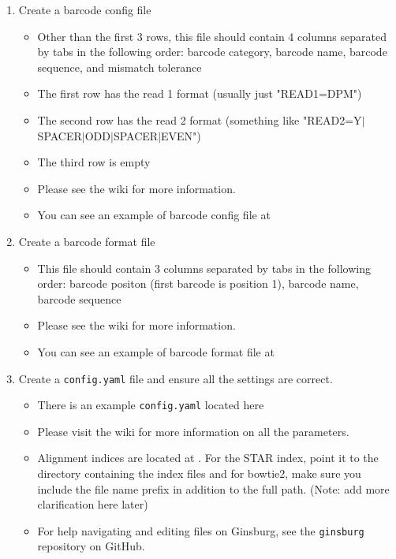 \documentclass{article}
\begin{document}
\begin{enumerate}
        \item Create a barcode config file
        \begin{itemize}
            \item Other than the first 3 rows, this file should contain 4 columns separated by tabs in the following order: barcode category, barcode name, barcode sequence, and mismatch tolerance
            \item The first row has the read 1 format (usually just "READ1=DPM")
            \item The second row has the read 2 format (something like "READ2=Y$\mid$SPACER$\mid$ODD$\mid$SPACER$\mid$EVEN")
            \item The third row is empty
            \item Please see the wiki for more information.
            \item You can see an example of barcode config file at 
        \end{itemize}

        \item Create a barcode format file
        \begin{itemize}
            \item This file should contain 3 columns separated by tabs in the following order: barcode positon (first barcode is position 1), barcode name, barcode sequence
            \item Please see the wiki for more information.
            \item You can see an example of barcode format file at 
        \end{itemize}

        \item Create a \texttt{config.yaml} file and ensure all the settings are correct.
        \begin{itemize}
            \item There is an example \texttt{config.yaml} located here 
            \item Please visit the wiki for more information on all the parameters.
            \item Alignment indices are located at . For the STAR index, point it to the directory containing the index files and for bowtie2, make sure you include the file name prefix in addition to the full path. (Note: add more clarification here later)
            \item For help navigating and editing files on Ginsburg, see the \texttt{ginsburg} repository on GitHub. 
        \end{itemize}


\end{enumerate}
\end{document}
